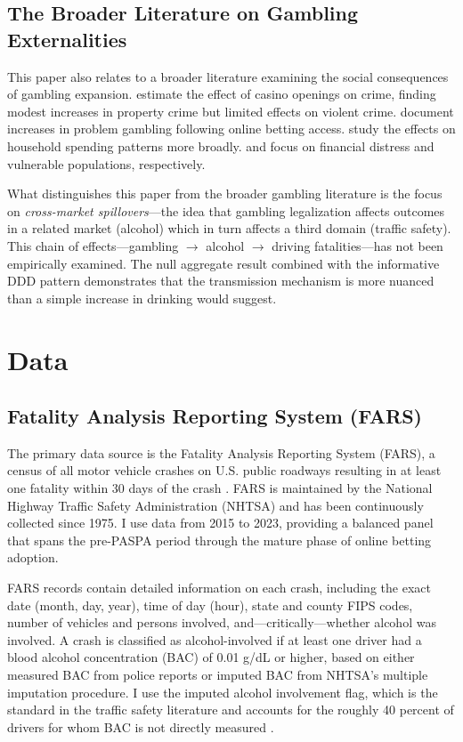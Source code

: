 \documentclass[12pt]{article}
\begin{document}
\subsection{The Broader Literature on Gambling Externalities}

This paper also relates to a broader literature examining the social consequences of gambling expansion. \citet{murphy2001legalized} estimate the effect of casino openings on crime, finding modest increases in property crime but limited effects on violent crime. \citet{baskent2024sports} document increases in problem gambling following online betting access. \citet{agan2024sports} study the effects on household spending patterns more broadly. \citet{hollenbeck2025financial} and \citet{baker2024vulnerable} focus on financial distress and vulnerable populations, respectively.

What distinguishes this paper from the broader gambling literature is the focus on \emph{cross-market spillovers}---the idea that gambling legalization affects outcomes in a related market (alcohol) which in turn affects a third domain (traffic safety). This chain of effects---gambling $\rightarrow$ alcohol $\rightarrow$ driving fatalities---has not been empirically examined. The null aggregate result combined with the informative DDD pattern demonstrates that the transmission mechanism is more nuanced than a simple increase in drinking would suggest.


\section{Data}
\label{sec:data}

\subsection{Fatality Analysis Reporting System (FARS)}

The primary data source is the Fatality Analysis Reporting System (FARS), a census of all motor vehicle crashes on U.S. public roadways resulting in at least one fatality within 30 days of the crash \citep{nhtsa2023fars}. FARS is maintained by the National Highway Traffic Safety Administration (NHTSA) and has been continuously collected since 1975. I use data from 2015 to 2023, providing a balanced panel that spans the pre-PASPA period through the mature phase of online betting adoption.

FARS records contain detailed information on each crash, including the exact date (month, day, year), time of day (hour), state and county FIPS codes, number of vehicles and persons involved, and---critically---whether alcohol was involved. A crash is classified as alcohol-involved if at least one driver had a blood alcohol concentration (BAC) of 0.01 g/dL or higher, based on either measured BAC from police reports or imputed BAC from NHTSA's multiple imputation procedure. I use the imputed alcohol involvement flag, which is the standard in the traffic safety literature and accounts for the roughly 40 percent of drivers for whom BAC is not directly measured \citep{carpenter2011effect}.
\end{document}
